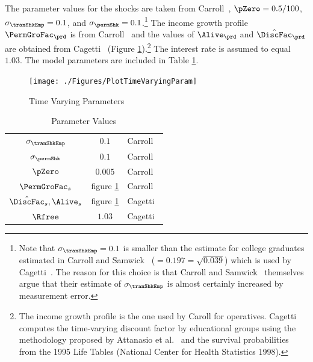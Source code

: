 \documentclass[titlepage, headings=optiontotocandhead]{econtex}
\begin{document}
The parameter values for the shocks are taken from Carroll~\citeyearpar{carroll:brookings}, $\pZero=0.5/100$, $\sigma _{\tranShkEmp }=0.1$, and $\sigma_{\permShk}=0.1$.\footnote{Note that $\sigma _{\tranShkEmp}=0.1$ is smaller than the estimate for college graduates estimated in
  Carroll and Samwick~\citeyearpar{carroll&samwick:nature} ($=0.197=\sqrt{0.039}$) which is used by Cagetti~\citeyearpar{cagettiWprofiles}. The reason for this choice is that Carroll and Samwick~\citeyearpar{carroll&samwick:nature} themselves argue that their estimate of $\sigma_{\tranShkEmp }$ is almost certainly increased by measurement error.} The income growth profile $\PermGroFac_{\prd}$ is from Carroll~\citeyearpar{carrollBSLCPIH} and the values of $\Alive_{\prd}$ and $\hat{\DiscFac}_{\prd}$ are obtained from Cagetti~\citeyearpar{cagettiWprofiles} (Figure \ref{fig:TimeVaryingParam}).\footnote{The income growth profile is the one used by Caroll for operatives. Cagetti computes the time-varying discount factor by educational groups using the methodology proposed by Attanasio et al.~\citeyearpar{AttanasioBanksMeghirWeber} and the survival probabilities from the 1995 Life Tables (National Center for Health Statistics 1998).} The interest rate is assumed to equal $1.03$. The model parameters are included in Table \ref{table:StrEstParams}.

\hypertarget{PlotTimeVaryingParam}{}
\begin{figure}[h]
  \texttt{[image: ./Figures/PlotTimeVaryingParam]}
  \caption{Time Varying Parameters}
  \label{fig:TimeVaryingParam}
\end{figure}

\begin{table}[h]
  \caption{Parameter Values}\label{table:StrEstParams}
  \begin{center}
    \begin{tabular}{ccl}
      \hline\hline
      $\sigma _{\tranShkEmp}$    & $0.1$ & Carroll~\citeyearpar{carroll:brookings}
      \\ $\sigma _{\permShk}$   & $0.1$ & Carroll~\citeyearpar{carroll:brookings}
      \\ $\pZero$           & $0.005$  & Carroll~\citeyearpar{carroll:brookings}
      \\ $\PermGroFac_{s}$        & figure \ref{fig:TimeVaryingParam} & Carroll~\citeyearpar{carrollBSLCPIH}
      \\ $\hat{\DiscFac}_{s},\Alive_{s}$ & figure \ref{fig:TimeVaryingParam} & Cagetti~\citeyearpar{cagettiWprofiles}
      \\$\Rfree$            & $1.03$  & Cagetti~\citeyearpar{cagettiWprofiles}\\
      \hline
    \end{tabular}
  \end{center}
\end{table}
\end{document}
